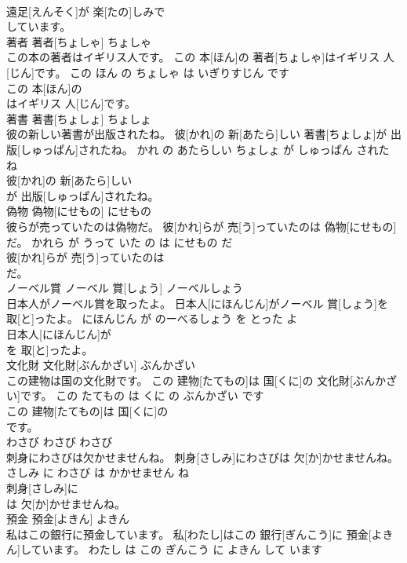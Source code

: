 \documentclass[8pt]{extreport}
\begin{document}
\begin{CJK}{UTF8}{min}
\\	遠足[えんそく]が 楽[たの]しみで
\\	しています。			
\\	著者	著者[ちょしゃ]	ちょしゃ	
\\	この本の著者はイギリス人です。	この 本[ほん]の 著者[ちょしゃ]はイギリス 人[じん]です。	この ほん の ちょしゃ は いぎりすじん です	
\\	この 本[ほん]の
\\	はイギリス 人[じん]です。			
\\	著書	著書[ちょしょ]	ちょしょ	
\\	彼の新しい著書が出版されたね。	彼[かれ]の 新[あたら]しい 著書[ちょしょ]が 出版[しゅっぱん]されたね。	かれ の あたらしい ちょしょ が しゅっぱん された ね	
\\	彼[かれ]の 新[あたら]しい
\\	が 出版[しゅっぱん]されたね。			
\\	偽物	偽物[にせもの]	にせもの	
\\	彼らが売っていたのは偽物だ。	彼[かれ]らが 売[う]っていたのは 偽物[にせもの]だ。	かれら が うって いた の は にせもの だ	
\\	彼[かれ]らが 売[う]っていたのは
\\	だ。			
\\	ノーベル賞	ノーベル 賞[しょう]	ノーベルしょう	
\\	日本人がノーベル賞を取ったよ。	日本人[にほんじん]がノーベル 賞[しょう]を 取[と]ったよ。	にほんじん が のーべるしょう を とった よ	
\\	日本人[にほんじん]が
\\	を 取[と]ったよ。			
\\	文化財	文化財[ぶんかざい]	ぶんかざい	
\\	この建物は国の文化財です。	この 建物[たてもの]は 国[くに]の 文化財[ぶんかざい]です。	この たてもの は くに の ぶんかざい です	
\\	この 建物[たてもの]は 国[くに]の
\\	です。			
\\	わさび	わさび	わさび	
\\	刺身にわさびは欠かせませんね。	刺身[さしみ]にわさびは 欠[か]かせませんね。	さしみ に わさび は かかせません ね	
\\	刺身[さしみ]に
\\	は 欠[か]かせませんね。			
\\	預金	預金[よきん]	よきん	
\\	私はこの銀行に預金しています。	私[わたし]はこの 銀行[ぎんこう]に 預金[よきん]しています。	わたし は この ぎんこう に よきん して います	

\end{CJK}
\end{document}
